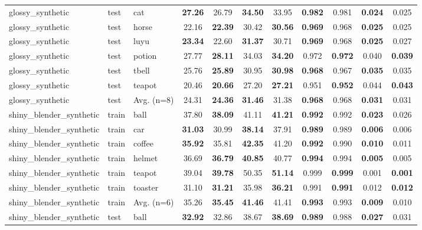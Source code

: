\begin{table}[t]
{\begin{tabular}{lllcccccccc}
glossy\_synthetic & test & cat & \textbf{27.26} & 26.79 & \textbf{34.50} & 33.95 & \textbf{0.982} & 0.981 & \textbf{0.024} & 0.025 \\
glossy\_synthetic & test & horse & 22.16 & \textbf{22.39} & 30.42 & \textbf{30.56} & \textbf{0.969} & 0.968 & \textbf{0.025} & 0.025 \\
glossy\_synthetic & test & luyu & \textbf{23.34} & 22.60 & \textbf{31.37} & 30.71 & \textbf{0.969} & 0.968 & \textbf{0.025} & 0.027 \\
glossy\_synthetic & test & potion & 27.77 & \textbf{28.11} & 34.03 & \textbf{34.20} & 0.972 & \textbf{0.972} & 0.040 & \textbf{0.039} \\
glossy\_synthetic & test & tbell & 25.76 & \textbf{25.89} & 30.95 & \textbf{30.98} & \textbf{0.968} & 0.967 & \textbf{0.035} & 0.035 \\
glossy\_synthetic & test & teapot & 20.46 & \textbf{20.66} & 27.20 & \textbf{27.21} & 0.951 & \textbf{0.952} & 0.044 & \textbf{0.043} \\
glossy\_synthetic & test & Avg. (n=8) & 24.31 & \textbf{24.36} & \textbf{31.46} & 31.38 & \textbf{0.968} & 0.968 & \textbf{0.031} & 0.031 \\
\midrule
shiny\_blender\_synthetic & train & ball & 37.80 & \textbf{38.09} & 41.11 & \textbf{41.21} & \textbf{0.992} & 0.992 & \textbf{0.023} & 0.026 \\
shiny\_blender\_synthetic & train & car & \textbf{31.03} & 30.99 & \textbf{38.14} & 37.91 & \textbf{0.989} & 0.989 & \textbf{0.006} & 0.006 \\
shiny\_blender\_synthetic & train & coffee & \textbf{35.92} & 35.81 & \textbf{42.35} & 41.20 & \textbf{0.992} & 0.990 & \textbf{0.010} & 0.011 \\
shiny\_blender\_synthetic & train & helmet & 36.69 & \textbf{36.79} & \textbf{40.85} & 40.77 & \textbf{0.994} & 0.994 & \textbf{0.005} & 0.005 \\
shiny\_blender\_synthetic & train & teapot & 39.04 & \textbf{39.78} & 50.35 & \textbf{51.14} & 0.999 & \textbf{0.999} & 0.001 & \textbf{0.001} \\
shiny\_blender\_synthetic & train & toaster & 31.10 & \textbf{31.21} & 35.98 & \textbf{36.21} & 0.991 & \textbf{0.991} & 0.012 & \textbf{0.012} \\
shiny\_blender\_synthetic & train & Avg. (n=6) & 35.26 & \textbf{35.45} & \textbf{41.46} & 41.41 & \textbf{0.993} & 0.993 & \textbf{0.009} & 0.010 \\
\midrule
shiny\_blender\_synthetic & test & ball & \textbf{32.92} & 32.86 & 38.67 & \textbf{38.69} & \textbf{0.989} & 0.988 & \textbf{0.027} & 0.031 \\

\end{tabular}}
\end{table}
